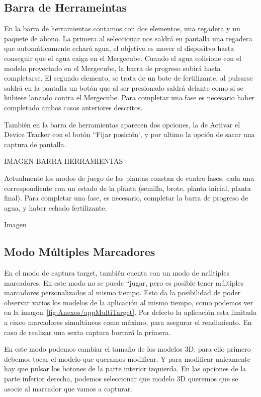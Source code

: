 \subsection{Barra de Herrameintas}
En la barra de herramientas contamos con dos elementos, una regadera y un paquete de abono. La primera al seleccionar nos saldrá en pantalla una regadera que automáticamente echará agua, el objetivo es mover el dispositvo hasta conseguir que el agua caiga en el Mergecube. Cuando el agua colisione con el modelo proyectado en el Mergecube, la barra de progreso subirá hasta completarse. 
El segundo elemento, se trata de un bote de fertilizante, al pulsarse saldrá en la pantalla un botón que al ser presionado saldrá delante como si se hubiese lanzado contra el Mergecube.
Para completar una fase es necesario haber completado ambos casos anteriores descritos.

También en la barra de herramientas aparecen dos opciones, la de Activar el Device Tracker con el botón ``Fijar posición`, y por ultimo la opción de sacar una captura de pantalla.

IMAGEN BARRA HERRAMIENTAS

Actualmente los modos de juego de las plantas constan de cuatro fases, cada una correspondiente con un estado de la planta (semilla, brote, planta inicial, planta final). Para completar una fase, es necesario, completar la barra de progreso de agua, y haber echado fertilizante.

Imagen

\subsection{Modo Múltiples Marcadores}
En el modo de captura target, también cuenta con un modo de múltiples marcadores. En este modo no se puede ``jugar, pero es posible tener múltiples marcadores personalizados al mismo tiempo. Esto da la posibilidad de poder observar varios los modelos de la aplicación al mismo tiempo, como podemos ver en la imagen~\ref{fig:Anexos/appMultiTarget}. Por defecto la aplicación esta limitada a cinco marcadores simultáneos como máximo, para asegurar el rendimiento. En caso de realizar una sexta captura borrará la primera.


En este modo podemos cambiar el tamaño de los modelos 3D, para ello primero debemos tocar el modelo que queramos modificar. Y para modificar unicamente hay que pulsar los botones de la parte interior izquierda.
En las opciones de la parte inferior derecha, podemos seleccionar que modelo 3D queremos que se asocie al marcador que vamos a capturar.


 

